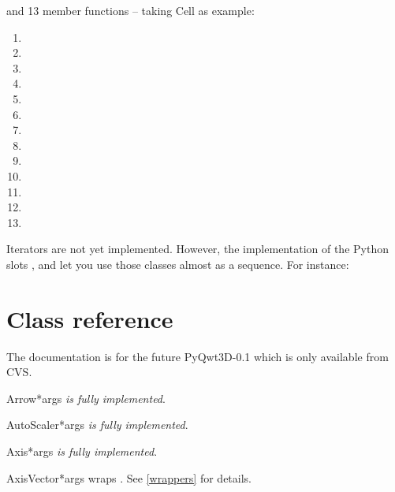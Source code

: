 \documentclass{manual}
\newcommand{\Future}{
  \begin{notice}[warning]
    The documentation is for the future PyQwt3D-0.1 which is only available
    from CVS.
  \end{notice}
}
\begin{document}
and 13 member functions -- taking Cell as example:
\begin{enumerate}
\item
\item
\item
\item
\item
\item
\item
\item
\item
\item
\item
\item
\item
\end{enumerate}

Iterators are not yet implemented. However, the implementation of the
Python slots ,  and
 let you use those classes almost as a sequence.
For instance:



\section{Class reference \label{classes}}

\Future{}

\begin{classdesc}{Arrow}{*args}
\emph{is fully implemented}.
\end{classdesc}

\begin{classdesc}{AutoScaler}{*args}
\emph{is fully implemented}.
\end{classdesc}

\begin{classdesc}{Axis}{*args}
\emph{is fully implemented}.
\end{classdesc}

\begin{classdesc}{AxisVector}{*args}
wraps . See \ref{wrappers} for details.
\end{classdesc}
\end{document}
